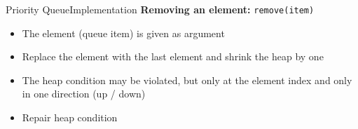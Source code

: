 \begin{frame}{Priority Queue}{Implementation}
  \textbf{Removing an element:}
   {\color{Mittel-Blau}\texttt{remove(item)}}
     \begin{figure}[!h]
      \begin{adjustbox}{height=0.275\linewidth}
      \end{adjustbox}
      \hspace{0.5em}\hspace{-1.0em}
      \begin{adjustbox}{height=0.275\linewidth}
      \end{adjustbox}
      \label{fig:priority_queue:impl_remove}%
    \end{figure}%
  \begin{itemize}
    \item<2->
      The element (queue item) is given as argument
    \item<3->
      Replace the element with the last element and shrink the heap by one
    \item<4->
      The {\color{Mittel-Blau}heap condition} may be violated, but only at the
      element index and only in one direction (up / down)
    \item<5->
      Repair {\color{Mittel-Blau}heap condition}
  \end{itemize}
\end{frame}


